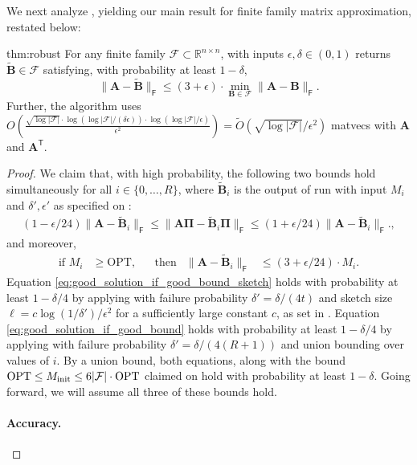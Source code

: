 \documentclass{article}[11pt]
\theoremstyle{definition}
\newcommand{\bv}[1]{\boldsymbol{\mathbf{#1}}}
\newcommand{\R}{\mathbb{R}}
\newcommand{\Fro}{\mathsf{F}}
\newcommand{\F}{\mathcal{F}}
\newcommand{\OPT}{\mathrm{OPT}}
\newcommand{\transpose}{\mathsf{T}}
\begin{document}
We next analyze , yielding our main result for finite family matrix approximation, restated below:
\begin{reptheorem}{thm:robust}
    For any finite family $\mathcal{F} \subset \R^{n \times n}$,  with inputs $\epsilon,\delta \in (0,1)$ returns $\bv{\tilde B} \in \mathcal{F}$ satisfying, with probability at least $1-\delta$,
    $$\|\bv{A} - \bv{\tilde B}\|_\Fro \leq (3+\epsilon) \cdot \min_{\bv B \in \mathcal{F}} \|\bv A - \bv B\|_\Fro.$$
    Further, the algorithm uses $O\left(\frac{\sqrt{\log|\F|} \cdot \log(\log|\F|/(\delta \epsilon)) \cdot \log(\log|\F|/\epsilon)}{\epsilon^2}\right) = \tilde O(\sqrt{\log|\F|}/\epsilon^2)$ matvecs with $\bv A$ and $\bv{A}^\transpose$.
\end{reptheorem}
\begin{proof}
    We claim that, with high probability, the following two bounds hold simultaneously for all $i \in \{0, \ldots, R\}$, where $\bv{\tilde B}_i$ is the output of  run with input $M_i$ and $\delta',\epsilon'$ as specified on :
    \begin{align}
       (1-\epsilon/24) \|\bv A - \bv{\tilde B}_i\|_\Fro \le \|\bv A \bv \Pi - \bv{\tilde B}_i \bv \Pi\|_\Fro \le (1+\epsilon/24) \|\bv A - \bv{\tilde B}_i \|_\Fro. \label{eq:good_solution_if_good_bound_sketch},
    \end{align}
    and moreover,
    \begin{align}
        \text{if }M_i &\ge \OPT, & &\text{then} & \|\bv{A} - \bv{\tilde B}_i\|_\Fro &\leq (3+\epsilon/24) \cdot M_i. \label{eq:good_solution_if_good_bound}
    \end{align}
    Equation \eqref{eq:good_solution_if_good_bound_sketch} holds with probability at least $1-\delta/4$ by applying  with failure probability $\delta' = \delta/(4t)$ and sketch size $\ell = c \log(1/\delta')/\epsilon^2$ for a sufficiently large constant $c$, as set in .
    Equation \eqref{eq:good_solution_if_good_bound} holds with probability at least $1-\delta/4$ by applying   with failure probability $\delta' = \delta/(4(R+1))$ and union bounding over values of $i$.  By a union bound, both equations, along with the bound $\OPT \le M_{\rm init} \le 6 |\F| \cdot \OPT$ claimed on  hold with probability at least $1-\delta$. Going forward, we will assume all three of these bounds hold. 

    \paragraph{Accuracy.}


\end{proof}
\end{document}
